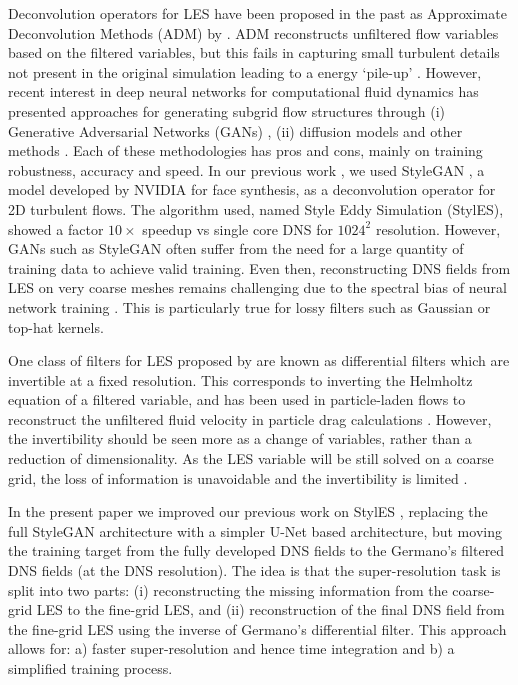 \documentclass[authoryear,preprint,review,12pt]{elsarticle}
\begin{document}
Deconvolution operators for LES have been proposed in the past as Approximate Deconvolution Methods (ADM) by \citet{stolz_approximate_1999}. ADM reconstructs unfiltered flow variables based on the filtered variables, but this fails in capturing small turbulent details not present in the original simulation leading to a energy `pile-up' \citep{amani2025novel}.
However, recent interest in deep neural networks for computational fluid dynamics \citep{wang_recent_2024} has presented approaches for generating subgrid flow structures through (i) Generative Adversarial Networks (GANs) \citep{goodfellow_generative_2014,bode_using_2021,nista2024influence,castagna_stylegan_2024}, (ii) diffusion models \citep{ho_denoising_2020,sardar2024spectrally,shu2023physicsDM} and other methods \citep{kim_unsupervised_2021, ling2016reynolds}. Each of these methodologies has pros and cons, mainly on training robustness, accuracy and speed. In our previous work \citep{castagna_stylegan_2024}, we used StyleGAN \citep{karras_style-based_2019}, a model developed by NVIDIA for face synthesis, as a deconvolution operator for 2D turbulent flows. The algorithm used, named Style Eddy Simulation (StylES), showed a factor $10\times$ speedup vs single core DNS for $1024^2$ resolution. However, GANs such as StyleGAN often suffer from the need for a large quantity of training data to achieve valid training. Even then, reconstructing DNS fields from LES on very coarse meshes remains challenging due to the spectral bias of neural network training \citep{rahaman2019spectralbias}. This is particularly true for lossy filters such as Gaussian or top-hat kernels. 

One class of filters for LES proposed by \citet{germano_differential_1986} are known as differential filters which are invertible at a fixed resolution. This corresponds to inverting the Helmholtz equation of a filtered variable, and has been used in particle-laden flows to reconstruct the unfiltered fluid velocity in particle drag calculations \citep{park2017particle}.
However, the invertibility should be seen more as a change of variables, rather than a reduction of dimensionality. As the LES variable will be still solved on a coarse grid, the loss of information is unavoidable and the invertibility is limited \citep{sagaut_large_2006}.

In the present paper we improved our previous work on StylES \citep{castagna_stylegan_2024}, replacing the full StyleGAN architecture with a simpler U-Net based architecture, but moving the training target from the fully developed DNS fields to the Germano's filtered DNS fields (at the DNS resolution). 
The idea is that the super-resolution task is split into two parts: (i) reconstructing the missing information from the coarse-grid LES to the fine-grid LES, and (ii) reconstruction of the final DNS field from the fine-grid LES using the inverse of Germano's differential filter.
This approach allows for: a) faster super-resolution and hence time integration and b) a simplified training process.
\end{document}
